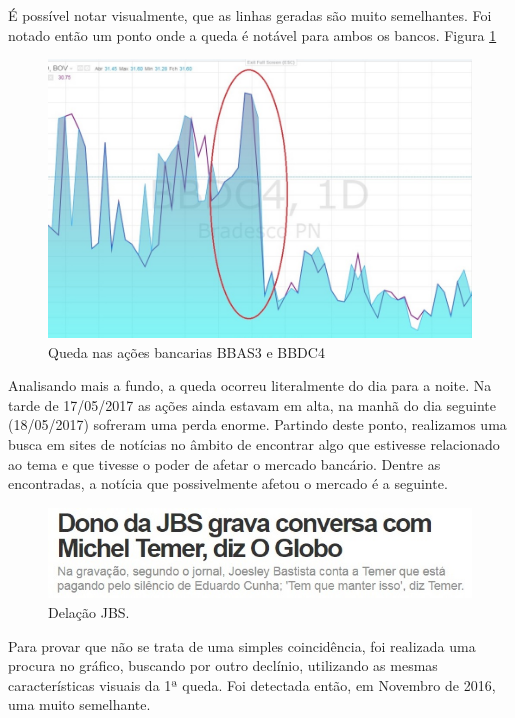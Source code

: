 \documentclass{sigchi}
\begin{document}
É possível notar visualmente, que as linhas geradas são muito semelhantes. Foi notado então um ponto onde a queda é notável para ambos os bancos. Figura \ref{fig2}


 \begin{figure}[!htb]
	\centering
	\includegraphics[scale=0.8]{./figures/figura5.jpg}
	\caption{Queda nas ações bancarias BBAS3 e BBDC4 }
	\label{fig2}
\end{figure}

Analisando mais a fundo, a queda ocorreu literalmente do dia para a noite. Na tarde de 17/05/2017 as ações ainda estavam em alta, na manhã do dia seguinte (18/05/2017) sofreram uma perda enorme. Partindo deste ponto, realizamos uma busca em sites de notícias no âmbito de encontrar algo que estivesse relacionado ao tema e que tivesse o poder de afetar o mercado bancário. Dentre as encontradas, a notícia que possivelmente afetou o mercado é a seguinte.

\begin{figure}[!htb]
	\centering
	\includegraphics[scale=0.4]{./figures/figura3.jpg}
	\caption{Delação JBS.}
	\label{figRotu}
\end{figure}

Para provar que não se trata de uma simples coincidência, foi realizada uma procura no gráfico, buscando por outro declínio, utilizando as mesmas características visuais da 1ª queda. Foi detectada então, em Novembro de 2016, uma muito semelhante.
\end{document}

